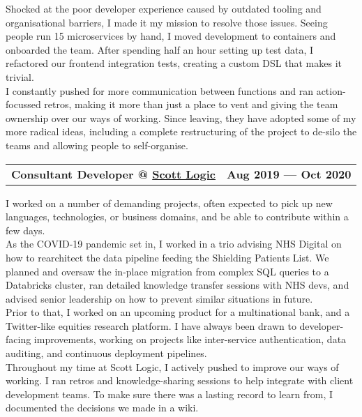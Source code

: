 \documentclass[hidelinks, 12pt, a4paper]{article}
\begin{document}
	\begin{multicols}{2}
		Shocked at the poor developer experience caused by outdated tooling and organisational barriers, I made it my mission to resolve those issues.
		Seeing people run 15 microservices by hand, I moved development to containers and onboarded the team.
		After spending half an hour setting up test data, I refactored our frontend integration tests, creating a custom DSL that makes it trivial.\\
		
		I constantly pushed for more communication between functions and ran action-focussed retros, making it more than just a place to vent and giving the team ownership over our ways of working.
		Since leaving, they have adopted some of my more radical ideas, including a complete restructuring of the project to de-silo the teams and allowing people to self-organise.\\
	\end{multicols}

	\begin{tabularx}{\linewidth}{@{}Xr@{}}
		\textbf{Consultant Developer @ \href{https://www.scottlogic.com/}{Scott Logic}} & \textbf{Aug 2019 --- Oct 2020}
	\end{tabularx}\vspace{2pt}
	
	\begin{multicols}{2}
		I worked on a number of demanding projects, often expected to pick up new languages, technologies, or business domains, and be able to contribute within a few days.\\
		
		As the COVID-19 pandemic set in, I worked in a trio advising NHS Digital on how to rearchitect the data pipeline feeding the Shielding Patients List.
		We planned and oversaw the in-place migration from complex SQL queries to a Databricks cluster, ran detailed knowledge transfer sessions with NHS devs, and advised senior leadership on how to prevent similar situations in future.\\
		
		Prior to that, I worked on an upcoming product for a multinational bank, and a Twitter-like equities research platform.
		I have always been drawn to developer-facing improvements, working on projects like inter-service authentication, data auditing, and continuous deployment pipelines.\\
		
		Throughout my time at Scott Logic, I actively pushed to improve our ways of working.
		I ran retros and knowledge-sharing sessions to help integrate with client development teams.
		To make sure there was a lasting record to learn from, I documented the decisions we made in a wiki.\\
	\end{multicols}
\end{document}
